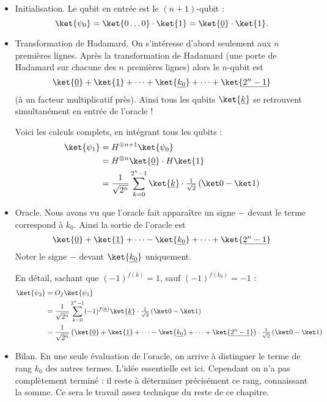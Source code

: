 \documentclass[11pt,class=report,crop=false]{standalone}
\begin{document}
\bigskip
\bigskip

\begin{itemize}
  \item Initialisation. Le qubit en entrée est le $(n+1)$-qubit :
  $$\ket{\psi_0} = \ket{0\ldots0} \cdot \ket{1} = \ket{\underline{0}} \cdot \ket{1}.$$

  \item Transformation de Hadamard.
On s'intéresse d'abord seulement aux $n$ premières lignes.
Après la transformation de Hadamard (une porte de Hadamard sur chacune des $n$ premières lignes) alors le $n$-qubit est 
$$\ket{\underline 0} + \ket{\underline 1} + \cdots + \ket{\underline{k_0}}+ \cdots + \ket{\underline{2^n-1}}$$
(à un facteur multiplicatif près). Ainsi tous les qubits $\ket{\underline k}$ se retrouvent simultanément en entrée de l'oracle !

Voici les calculs complets, en intégrant tous les qubits :
\begin{align*}
\ket{\psi_1} 
  &= H^{\otimes n+1} \ket{\psi_0} \\
  &= H^{\otimes n}\ket{\underline{0}} \cdot H\ket{1} \\
  &= \frac{1}{\sqrt{2^n}} \sum_{k=0}^{2^n-1} \ket{\underline k} \cdot \tfrac{1}{\sqrt{2}}\left(\ket0 - \ket1\right) \\
\end{align*}




  \item Oracle.
Nous avons vu que l'oracle fait apparaître un signe \og{}$-$\fg{} devant le terme correspond à $k_0$. Ainsi la sortie de l'oracle est
$$\ket{\underline 0} + \ket{\underline 1} + \cdots - \ket{\underline{k_0}}+ \cdots + \ket{\underline{2^n-1}}$$
Noter le signe \og{}$-$\fg{} devant $\ket{\underline{k_0}}$ uniquement.

En détail, sachant que $(-1)^{f(k)}=1$, sauf $(-1)^{f(k_0)}=-1$ :
\begin{align*}
\ket{\psi_2} 
  &= O_f \ket{\psi_1} \\
  &= \frac{1}{\sqrt{2^{n}}}\sum_{k=0}^{2^n-1} (-1)^{f(\underline k)} \ket{\underline k} \cdot \tfrac{1}{\sqrt{2}}\left(\ket0 - \ket1\right) \\
  &= \frac{1}{\sqrt{2^{n}}}\left( \ket{\underline 0} + \ket{\underline 1} + \cdots - \ket{\underline{k_0}}+ \cdots + \ket{\underline{2^n-1}} \right) \cdot \tfrac{1}{\sqrt{2}}\left(\ket0 - \ket1\right) \\
\end{align*}  


  \item Bilan. En une seule évaluation de l'oracle, on arrive à distinguer le terme de rang $k_0$ des autres termes. L'idée essentielle est ici. Cependant on n'a pas complètement terminé : il reste à déterminer précisément ce rang, connaissant la somme. Ce sera le travail assez technique du reste de ce chapitre. 

\end{itemize}
\end{document}
